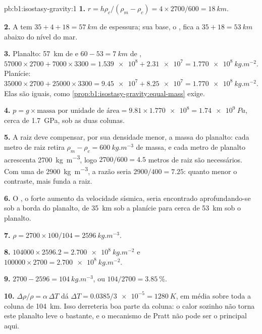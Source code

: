 \begin{solution}{pb:b1:isostasy-gravity:1}
\textbf{1.} $r = h\rho_c/(\rho_m - \rho_c) = 4\times2700/600 = \qty{18}{km}$.

\textbf{2.} A  tem $35 + 4 + 18 = \qty{57}{km}$ de espessura; sua base, o ,
fica a $35 + 18 = \qty{53}{km}$ abaixo do nível do mar.

\textbf{3.} Planalto: \qty{57}{km} de  e $60 - 53 = \qty{7}{km}$ de ,
$\num{57000}\times2700 + \num{7000}\times3300 = \num{1.539e8} + \num{2.31e7} =
\qty{1.770e8}{kg.m^{-2}}$. Planície: $\num{35000}\times2700 + \num{25000}\times3300
= \num{9.45e7} + \num{8.25e7} = \qty{1.770e8}{kg.m^{-2}}$. Elas são iguais, como
\cref{prop:b1:isostasy-gravity:equal-mass} exige.

\textbf{4.} $p = g\times\text{massa por unidade de área} = 9.81\times\num{1.770e8} =
\qty{1.74e9}{Pa}$, cerca de \qty{1.7}{GPa}, sob as duas colunas.

\textbf{5.} A raiz deve compensar, por sua densidade menor, a massa do
planalto: cada metro de raiz retira $\rho_m - \rho_c = \qty{600}{kg.m^{-3}}$ de
massa, e cada metro de planalto acrescenta \qty{2700}{kg.m^{-3}}, logo $2700/600 = 4.5$
metros de raiz são necessários. Com uma  de \qty{2900}{kg.m^{-3}}, a razão
seria $2900/400 = 7.25$: quanto menor o contraste, mais funda a raiz.

\textbf{6.} O , o forte aumento da velocidade sísmica, seria encontrado
aprofundando-se sob a borda do planalto, de \qty{35}{km} sob a planície
para cerca de \qty{53}{km} sob o planalto.

\textbf{7.} $\rho = 2700\times100/104 = \qty{2596}{kg.m^{-3}}$.

\textbf{8.} $\num{104000}\times2596.2 = \qty{2.700e8}{kg.m^{-2}}$ e
$\num{100000}\times2700 = \qty{2.700e8}{kg.m^{-2}}$.

\textbf{9.} $2700 - 2596 = \qty{104}{kg.m^{-3}}$, ou $104/2700 =
\qty{3.85}{\percent}$.

\textbf{10.} $\Delta\rho/\rho = \alpha\,\Delta T$ dá $\Delta T =
0.0385/\num{3e-5} = \qty{1280}{K}$, em média sobre toda a
coluna de \qty{104}{km}. Isso derreteria boa parte da coluna: o calor sozinho não torna este planalto leve o bastante, e o mecanismo de Pratt não pode ser o principal aqui.


\end{solution}
